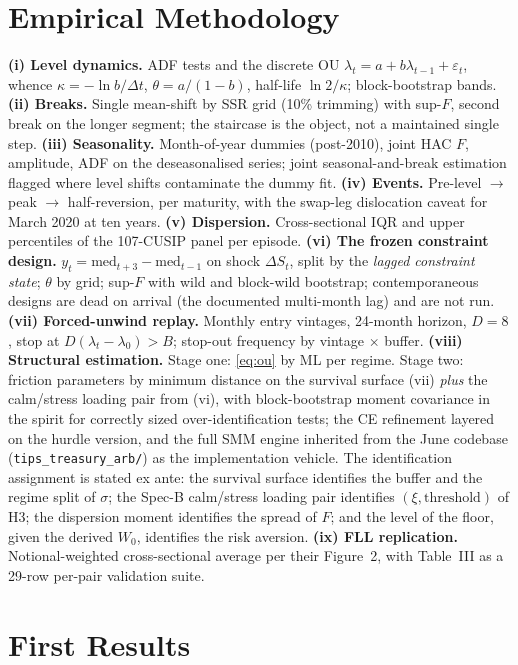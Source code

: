 \documentclass[11pt]{article}
\begin{document}
\section{Empirical Methodology}\label{sec:method}

\textbf{(i) Level dynamics.} ADF tests and the discrete OU $\lambda_t=a+b\lambda_{t-1}+\varepsilon_t$, whence $\kappa=-\ln b/\Delta t$, $\theta=a/(1-b)$, half-life $\ln2/\kappa$; block-bootstrap bands. \textbf{(ii) Breaks.} Single mean-shift by SSR grid (10\% trimming) with sup-$F$, second break on the longer segment; the staircase is the object, not a maintained single step. \textbf{(iii) Seasonality.} Month-of-year dummies (post-2010), joint HAC $F$, amplitude, ADF on the deseasonalised series; joint seasonal-and-break estimation flagged where level shifts contaminate the dummy fit. \textbf{(iv) Events.} Pre-level $\to$ peak $\to$ half-reversion, per maturity, with the swap-leg dislocation caveat for March 2020 at ten years. \textbf{(v) Dispersion.} Cross-sectional IQR and upper percentiles of the 107-CUSIP panel per episode. \textbf{(vi) The frozen constraint design.} $y_t=\text{med}_{t+3}-\text{med}_{t-1}$ on shock $\Delta S_t$, split by the \emph{lagged constraint state}; $\theta$ by grid; sup-$F$ with wild and block-wild bootstrap; contemporaneous designs are dead on arrival (the documented multi-month lag) and are not run. \textbf{(vii) Forced-unwind replay.} Monthly entry vintages, 24-month horizon, $D=8$, stop at $D(\lambda_t-\lambda_0)>B$; stop-out frequency by vintage $\times$ buffer. \textbf{(viii) Structural estimation.} Stage one: \eqref{eq:ou} by ML per regime. Stage two: friction parameters by minimum distance on the survival surface (vii) \emph{plus} the calm/stress loading pair from (vi), with block-bootstrap moment covariance in the \citet{gkr2014} spirit for correctly sized over-identification tests; the CE refinement layered on the hurdle version, and the full SMM engine inherited from the June codebase (\texttt{tips\_treasury\_arb/}) as the implementation vehicle. The identification assignment is stated ex ante: the survival surface identifies the buffer and the regime split of $\sigma$; the Spec-B calm/stress loading pair identifies $(\xi,\text{threshold})$ of H3; the dispersion moment identifies the spread of $F$; and the level of the floor, given the derived $W_0$, identifies the risk aversion. \textbf{(ix) FLL replication.} Notional-weighted cross-sectional average per their Figure~2, with Table~III as a 29-row per-pair validation suite.

\section{First Results}\label{sec:results}
\end{document}
